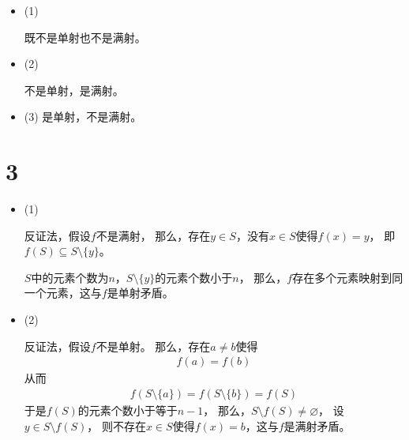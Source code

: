 \documentclass{article}
\begin{document}
\begin{itemize}
    \item (1)

          既不是单射也不是满射。

    \item (2)

          不是单射，是满射。

    \item (3)
          是单射，不是满射。
\end{itemize}

\section*{3}

\begin{itemize}
    \item (1)

          反证法，假设$f$不是满射，
          那么，存在$y \in S$，没有$x \in S$使得$f(x) = y$，
          即$f(S) \subseteq S \setminus \{y\}$。

          $S$中的元素个数为$n$，$S \setminus \{y\}$的元素个数小于$n$，
          那么，$f$存在多个元素映射到同一个元素，这与$f$是单射矛盾。

    \item (2)

          反证法，假设$f$不是单射。
          那么，存在$a \neq b$使得
          \begin{align*}
              f(a) = f(b)
          \end{align*}
          从而
          \begin{align*}
              f(S \setminus \{a\}) = f(S \setminus \{b\}) = f(S)
          \end{align*}
          于是$f(S)$的元素个数小于等于$n - 1$，
          那么，$ S \setminus f(S) \neq \varnothing$，
          设$y \in S \setminus f(S)$，
          则不存在$x \in S$使得$f(x) = b$，这与$f$是满射矛盾。
\end{itemize}
\end{document}
